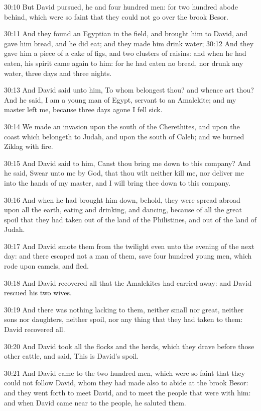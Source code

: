 30:10 But David pursued, he and four hundred men: for two hundred
abode behind, which were so faint that they could not go over the
brook Besor.

30:11 And they found an Egyptian in the field, and brought him to
David, and gave him bread, and he did eat; and they made him drink
water; 30:12 And they gave him a piece of a cake of figs, and two
clusters of raisins: and when he had eaten, his spirit came again to
him: for he had eaten no bread, nor drunk any water, three days and
three nights.

30:13 And David said unto him, To whom belongest thou? and whence art
thou? And he said, I am a young man of Egypt, servant to an Amalekite;
and my master left me, because three days agone I fell sick.

30:14 We made an invasion upon the south of the Cherethites, and upon
the coast which belongeth to Judah, and upon the south of Caleb; and
we burned Ziklag with fire.

30:15 And David said to him, Canst thou bring me down to this company?
And he said, Swear unto me by God, that thou wilt neither kill me, nor
deliver me into the hands of my master, and I will bring thee down to
this company.

30:16 And when he had brought him down, behold, they were spread
abroad upon all the earth, eating and drinking, and dancing, because
of all the great spoil that they had taken out of the land of the
Philistines, and out of the land of Judah.

30:17 And David smote them from the twilight even unto the evening of
the next day: and there escaped not a man of them, save four hundred
young men, which rode upon camels, and fled.

30:18 And David recovered all that the Amalekites had carried away:
and David rescued his two wives.

30:19 And there was nothing lacking to them, neither small nor great,
neither sons nor daughters, neither spoil, nor any thing that they had
taken to them: David recovered all.

30:20 And David took all the flocks and the herds, which they drave
before those other cattle, and said, This is David's spoil.

30:21 And David came to the two hundred men, which were so faint that
they could not follow David, whom they had made also to abide at the
brook Besor: and they went forth to meet David, and to meet the people
that were with him: and when David came near to the people, he saluted
them.

